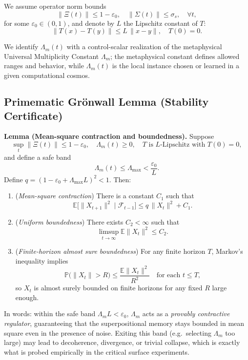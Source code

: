 \documentclass[11pt]{article}
\begin{document}
We assume operator norm bounds
\[
\|\Xi(t)\| \le 1-\varepsilon_0,\quad \|\Sigma(t)\|\le \sigma_s,\quad \forall t,
\]
for some $\varepsilon_0\in(0,1)$, and denote by $L$ the Lipschitz constant of $T$:
\[
\|T(x) - T(y)\|\le L\,\|x-y\|,\quad T(0)=0.
\]

We identify $\Lambda_m(t)$ with a control-scalar realization of the metaphysical Universal Multiplicity Constant $\Lambda_m$; the metaphysical constant defines allowed ranges and behavior, while $\Lambda_m(t)$ is the local instance chosen or learned in a given computational cosmos.

\subsection{Primematic Grönwall Lemma (Stability Certificate)}

\textbf{Lemma (Mean-square contraction and boundedness).} Suppose
\[
\sup_t \|\Xi(t)\|\le 1-\varepsilon_0,\quad \Lambda_m(t)\ge 0, \quad T\text{ is $L$-Lipschitz with }T(0)=0,
\]
and define a safe band
\[
\Lambda_m(t) \le \Lambda_{\max} < \frac{\varepsilon_0}{L}.
\]
Define $q=(1-\varepsilon_0 + \Lambda_{\max}L)^2<1$. Then:

\begin{enumerate}[leftmargin=1.5em,label=(\alph*)]
\item (\emph{Mean-square contraction}) There is a constant $C_1$ such that
\[
\mathbb{E}\big[\|X_{t+1}\|^2 \mid \mathcal{F}_{t-1}\big] \le q\, \|X_t\|^2 + C_1.
\]
\item (\emph{Uniform boundedness}) There exists $C_2<\infty$ such that
\[
\limsup_{t\to\infty} \mathbb{E}\|X_t\|^2 \le C_2.
\]
\item (\emph{Finite-horizon almost sure boundedness}) For any finite horizon $T$, Markov's inequality implies
\[
\mathbb{P}\big(\|X_t\| > R\big) \le \frac{\mathbb{E}\|X_t\|^2}{R^2}\quad\text{for each }t\le T,
\]
so $X_t$ is almost surely bounded on finite horizons for any fixed $R$ large enough.
\end{enumerate}

In words: within the safe band $\Lambda_m L<\varepsilon_0$, $\Lambda_m$ acts as a \emph{provably contractive regulator}, guaranteeing that the superpositional memory stays bounded in mean square even in the presence of noise. Exiting this band (e.g.\ selecting $\Lambda_m$ too large) may lead to decoherence, divergence, or trivial collapse, which is exactly what is probed empirically in the critical surface experiments.
\end{document}
